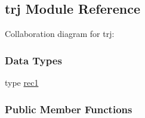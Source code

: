 \hypertarget{classtrj}{\subsection{trj Module Reference}
\label{classtrj}
}


Collaboration diagram for trj\-:
\subsubsection*{Data Types}
\begin{DoxyCompactItemize}
\item 
type \hyperlink{structtrj_1_1rec1}{rec1}
\end{DoxyCompactItemize}
\subsubsection*{Public Member Functions}
